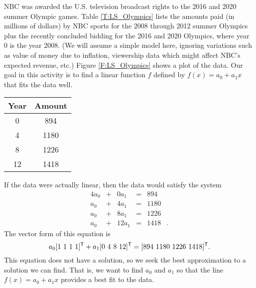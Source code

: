 \begin{pa} \label{pa:LS_1} NBC was awarded the U.S. television broadcast rights to the 2016 and 2020 summer Olympic games. Table \ref{T:LS_Olympics} lists the amounts paid (in millions of dollars) by NBC sports for the 2008 through 2012 summer Olympics plus the recently concluded bidding for the 2016 and 2020 Olympics, where year 0 is the year 2008. (We will assume a simple model here, ignoring variations such as value of money due to inflation, viewership data which might affect NBC's expected revenue, etc.) Figure \ref{F:LS_Olympics} shows a plot of the data. Our goal in this activity is to find a linear function $f$ defined by $f(x) = a_0 + a_1x$ that fits the data well. 

\begin{minipage}{\textwidth}
  \begin{minipage}[b]{0.49\textwidth}
    \centering
    \renewcommand{\arraystretch}{1.2}
\begin{tabular}{|c|c|} \hline
Year    &Amount \\ \hline
0	&894   \\ \hline 
4	&1180  \\ \hline 
8	&1226  \\ \hline 
12	&1418\\ \hline
\end{tabular}
      \label{T:LS_Olympics}
      \hfill
    \end{minipage}
  \begin{minipage}[b]{0.49\textwidth}
    \centering
    \resizebox{!}{1.35in}{\texttt{[image: 7\_d\_pa\_3]}}
    \label{F:LS_Olympics}
  \end{minipage}
 
\end{minipage}

If the data were actually linear, then the data would satisfy the system
\begin{alignat*}{4}
{}a_0 &{}+{}	&{0}a_1 &= &894&{}  \\
{}a_0 &{}+{}	&{4}a_1 &= &1180&{}  \\
{}a_0 &{}+{}	&{8}a_1 &= &1226&{}  \\
{}a_0 &{}+{}	&{12}a_1 &= &1418&{.}
\end{alignat*}
The vector form of this equation is
\[a_0 [1 \ 1 \ 1 \ 1]^{\mathsf{T}} + a_1[0 \ 4 \ 8 \ 12]^{\mathsf{T}} = [894 \ 1180 \ 1226 \ 1418]^{\mathsf{T}}.\]
This equation does not have a solution, so we seek the best approximation to a solution we can find.  That is, we want to find $a_0$ and $a_1$ so that the line $f(x) = a_0+a_1x$ provides a best fit to the data.  


\end{pa}
